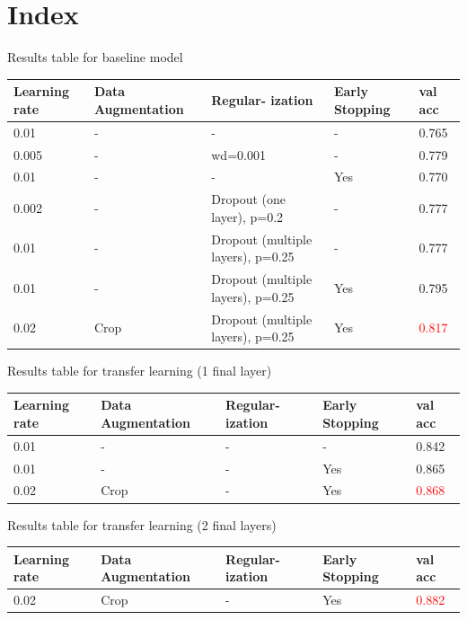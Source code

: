 \documentclass[sigconf,nonacm]{acmart}
\begin{document}
\newpage
\section{Index}
Results table for baseline model

\begin{tabular}{| m{1cm} | m{1cm}| m{1cm} | m{1cm}| m{1cm}|} 
\hline
Learning rate & Data Augmentation & Regular- ization & Early Stopping & val acc\\ 
\hline
0.01 & - & - & -  & 0.765\\ 
\hline
0.005 & - & wd=0.001 & -  & 0.779\\ 
\hline
0.01 & - & - & Yes &  0.770\\ 
\hline
0.002 & - & Dropout (one layer), p=0.2 & - &  0.777\\ 
\hline
0.01 & - & Dropout (multiple layers), p=0.25 & - &  0.777\\ 
\hline
0.01 & - & Dropout (multiple layers), p=0.25 & Yes &  0.795\\ 
\hline
0.02 & Crop & Dropout (multiple layers), p=0.25 & Yes &  \textcolor{red}{0.817}\\ 
\hline

\end{tabular}

\vspace{5mm} %
Results table for transfer learning (1 final layer)

\begin{tabular}{| m{1cm} | m{1cm}| m{1cm} | m{1cm}|  m{1cm}|} 
\hline
Learning rate & Data Augmentation & Regular- ization & Early Stopping  & val acc\\ 
\hline
0.01 & - & - & -  & 0.842\\ 
\hline
0.01 & - & - & Yes  & 0.865\\ 
\hline
0.02 & Crop & - & Yes  & \textcolor{red}{0.868}\\ 
\hline

\end{tabular}

\vspace{5mm} %
Results table for transfer learning (2 final layers)

\begin{tabular}{| m{1cm} | m{1cm}| m{1cm} | m{1cm}|  m{1cm}|} 
\hline
Learning rate & Data Augmentation & Regular- ization & Early Stopping  & val acc\\ 
\hline
0.02 & Crop & - & Yes  & \textcolor{red}{0.882}\\ 
\hline


\end{tabular}
\end{document}
